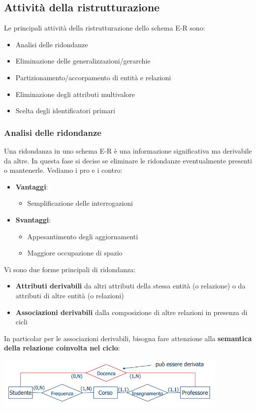 \documentclass[12pt]{article}
\begin{document}
\subsection{Attività della ristrutturazione}
Le principali attività della ristrutturazione dello schema E-R sono:
\begin{itemize}
    \item Analisi delle ridondanze
    \item Eliminazione delle generalizzazioni/gerarchie
    \item Partizionamento/accorpamento di entità e relazioni
    \item Eliminazione degli attributi multivalore
    \item Scelta degli identificatori primari
\end{itemize}
\subsubsection{Analisi delle ridondanze}
Una ridondanza in uno schema E-R è una informazione significativa ma derivabile da altre.
In questa fase si decise se eliminare le ridondanze eventualmente presenti o mantenerle.
Vediamo i pro e i contro:
\begin{itemize}
    \item \textbf{Vantaggi}:
    \begin{itemize}
        \item Semplificazione delle interrogazioni
    \end{itemize}
    \item \textbf{Svantaggi}:
    \begin{itemize}
        \item Appesantimento degli aggiornamenti
        \item Maggiore occupazione di spazio
    \end{itemize}
\end{itemize}
Vi sono due forme principali di ridondanza:
\begin{itemize}
    \item \textbf{Attributi derivabili} da altri attributi della stessa entità (o relazione) o da attributi di altre entità (o relazioni)
    \item \textbf{Associazioni derivabili} dalla composizione di altre relazioni in presenza di cicli
\end{itemize}
In particolar per le associazioni derivabili, bisogna fare attenzione alla \textbf{semantica della relazione coinvolta nel ciclo}:
\begin{center}
    \includegraphics[width = 0.85\textwidth]{Images/97.PNG}
\end{center}
\end{document}
